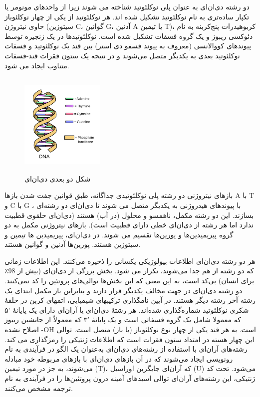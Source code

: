 \documentclass[12pt,a4paper,BCOR=.7cm,headsepline,bibliography=totoc]{report}
\begin{document}
دو رشته دی‌ان‌ای به عنوان پلی نوکلئوتید شناخته می شوند زیرا از واحدهای مونومر یا تکپار ساده‌تری به نام نوکلئوتید تشکیل شده اند. هر نوکلئوتید از یکی از چهار نوکلئوباز حاوی نیتروژن (سیتوزین C، گوانین G، آدنین A یا تیمین T)،  کربوهیدرات پنج‌کربنه به نام دئوکسی ریبوز و یک گروه فسفات تشکیل شده است. نوکلئوتیدها در یک زنجیره توسط پیوندهای کووالانسی (معروف به پیوند فسفو دی استر) بین قند یک نوکلئوتید و فسفات نوکلئوتید بعدی به یکدیگر متصل می‌شوند و در نتیجه یک ستون فقرات قند-فسفات متناوب ایجاد می شود.
\begin{figure}
\centering
\includegraphics[width=4cm, height=5cm]{pictures/DNApng.png}
\caption{
شکل دو بعدی دی‌ان‌ای \cite{graph1}
}\label{wrap-fig:2}
\end{figure}
 بازهای نیتروژنی دو رشته پلی نوکلئوتیدی جداگانه، طبق قوانین جفت شدن باز‌ها 
\lr{)}A با T و C با G\lr{(}
، با پیوندهای هیدروژنی به یکدیگر متصل می شوند تا دی‌ان‌ای دو رشته‌ای بسازند. این دو رشته مکمل، ناهمسو و محلول (در آب) هستند (دی‌ان‌ای حلقوی قطبیت ندارد اما هر رشته از دی‌ان‌ای خطی دارای قطبیت است). بازهای نیتروژنی مکمل به دو گروه پیریمیدین‌ها و پورین‌ها تقسیم می شوند. در دی‌ان‌ای، پیریمیدین ها تیمین و سیتوزین هستند. پورین‌ها آدنین و گوانین هستند.


هر دو رشته دی‌ان‌ای اطلاعات بیولوژیکی یکسانی را ذخیره می‌کنند. این اطلاعات زمانی که دو رشته از هم جدا می‌شوند، تکرار می شود. بخش بزرگی از دی‌ان‌ای (بیش از 98٪ برای انسان) بی‌کد
 است، به این معنی که این بخش‌ها توالی‌های پروتئین را کد نمی‌کنند. دو رشته دی‌ان‌ای در جهت مخالف یکدیگر قرار دارند و بنابراین باز مکمل ابتدای یک رشته آخر رشته دیگر هستند. در آیین نامگذاری ترکیبهای شیمیایی، اتمهای کربن در حلقهٔ شکری نوکلئوتید شماره‌گذاری شده‌اند. هر رشتهٔ دی‌ان‌ای یا آران‌ای دارای یک پایانهٔ '۵ که معمولا شامل یک گروه فسفاتی است و یک پایانهٔ '۳ که معمولاً از جانشین ریبوز اصلاح نشده -OH است. به هر قند یکی از چهار نوع نوکلئوباز (یا باز) متصل است. توالی این چهار هسته در امتداد ستون فقرات است که اطلاعات ژنتیکی را رمزگذاری می کند. رشته‌های آر‌ان‌ای با استفاده از رشته‌های دی‌ان‌ای به‌عنوان یک الگو در فرآیندی به نام رونویسی ایجاد می‌شوند که در آن بازهای دی‌ان‌ای با بازهای مربوطه خود مبادله می‌شوند، به جز در مورد تیمین (T)، که آر‌ان‌ای جایگزین اوراسیل (U) می‌شود. تحت کد ژنتیکی، این رشته‌های آر‌ان‌ای توالی اسیدهای آمینه درون پروتئین‌ها را در فرآیندی به نام ترجمه مشخص می‌کنند.
\end{document}
